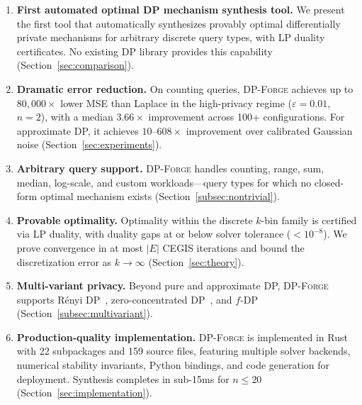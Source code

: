 \documentclass[11pt,a4paper]{article}
\newcommand{\dpforge}{\textsc{DP-Forge}}
\newcommand{\eps}{\varepsilon}
\begin{document}
\begin{enumerate}[label=\textbf{C\arabic*.},nosep]
  \item \textbf{First automated optimal DP mechanism synthesis tool.}
        We present the first tool that automatically synthesizes provably optimal
        differentially private mechanisms for arbitrary discrete query types, with
        LP duality certificates.  No existing DP library provides this capability
        (Section~\ref{sec:comparison}).

  \item \textbf{Dramatic error reduction.}  On counting queries,
        \dpforge{} achieves up to $80{,}000\times$ lower MSE than Laplace in the
        high-privacy regime ($\eps = 0.01$, $n=2$), with a median
        $3.66\times$ improvement across 100+ configurations.  For approximate DP,
        it achieves $10$--$608\times$ improvement over calibrated Gaussian noise
        (Section~\ref{sec:experiments}).

  \item \textbf{Arbitrary query support.}  \dpforge{} handles counting, range,
        sum, median, log-scale, and custom workloads---query types for which no
        closed-form optimal mechanism exists (Section~\ref{subsec:nontrivial}).

  \item \textbf{Provable optimality.}  Optimality within the discrete $k$-bin
        family is certified via LP duality, with duality gaps at or below solver
        tolerance ($< 10^{-8}$).  We prove convergence in at most $|E|$ CEGIS
        iterations and bound the discretization error as $k \to \infty$
        (Section~\ref{sec:theory}).

  \item \textbf{Multi-variant privacy.}  Beyond pure and approximate DP,
        \dpforge{} supports R\'enyi DP~\cite{mironov2017renyi},
        zero-concentrated DP~\cite{bun2016concentrated}, and
        $f$-DP~\cite{dong2022gaussian} (Section~\ref{subsec:multivariant}).

  \item \textbf{Production-quality implementation.}  \dpforge{} is implemented
        in Rust with 22 subpackages and 159 source files, featuring multiple
        solver backends, numerical stability invariants, Python bindings, and
        code generation for deployment.  Synthesis completes in sub-15ms for
        $n \le 20$ (Section~\ref{sec:implementation}).
\end{enumerate}
\end{document}
